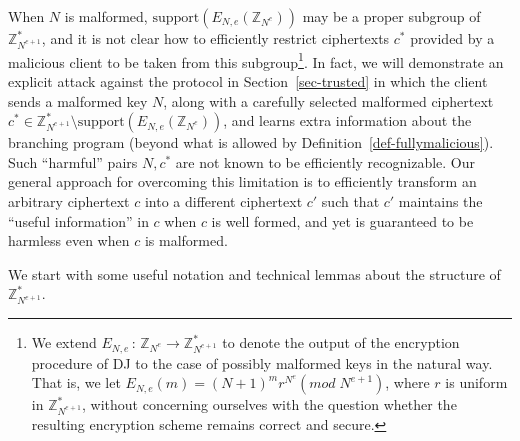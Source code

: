 \documentclass[11pt]{article}
\newcommand{\encdj}{{E}_{N,e}}
\newcommand{\support}{{\mathrm{support}}}
\newcommand{\plain}{{{M}}}
\newcommand{\plaintext}[1]{\plain_{#1}}
\newcommand{\fnrngdom}[2]{#1\to#2}
\newcommand{\fndef}[3]{{#1\,:\,\fnrngdom{#2}{#3}}}
\newcommand{\Z}{{\mathbb{Z}}}
\newcommand{\ot}{\mbox{OT}\;}
\newcommand{\U}[1]{\mathbb{Z}_{#1}^*}
\begin{document}
When $N$ is malformed, $\support(\encdj(\Z_{N^e}))$ may be a proper
subgroup of $\U{N^{e+1}}$,
and it is not clear how to efficiently restrict ciphertexts $c^*$
provided by a malicious client to be taken from this subgroup\footnote{We extend $\fndef{E_{N,e}}{\Z_{N^e}}{\Z^*_{N^{e+1}}}$ to denote
the output of the encryption procedure of DJ to the case of possibly malformed keys in the natural way. That is, we let $E_{N,e}(m)=(N+1)^mr^{N^e}(mod\;N^{e+1})$,
where $r$ is uniform in $\Z^*_{N^{e+1}}$, without concerning ourselves with the question whether the resulting encryption scheme remains correct and secure.}. In
fact, we will demonstrate an explicit attack against the protocol
in Section~\ref{sec-trusted} in which the client sends a malformed
key $N$, along with a carefully selected malformed ciphertext
$c^*\in \U{N^{e+1}}\setminus \support(\encdj(\Z_{N^e}))$, and
learns extra information about the branching program (beyond what
is allowed by Definition~\ref{def-fullymalicious}). Such
``harmful'' pairs $N,c^*$ are not known to be efficiently
recognizable. Our general approach for overcoming this limitation
is to efficiently transform an arbitrary ciphertext $c$ into a
different ciphertext $c'$ such that $c'$ maintains the ``useful
information'' in $c$ when $c$ is well formed, and yet is guaranteed
to be harmless even when $c$ is malformed.

\medskip

We start with some useful notation and technical lemmas about the structure of
$\U{N^{e+1}}$.
\end{document}
